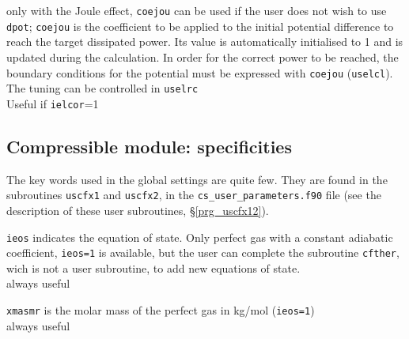 {only with the Joule effect, \texttt{coejou} can be used if the user does not
wish to use \texttt{dpot}; \texttt{coejou} is the coefficient to be applied
to the initial potential difference to reach the target dissipated power.
Its value is automatically initialised to 1 and is updated during the
calculation. In order for the correct power to be reached, the boundary
conditions for the potential must be expressed with \texttt{coejou}
(\texttt{uselcl}). The tuning can be controlled in \texttt{uselrc}\\
Useful if \texttt{ielcor}=1}

\subsection{Compressible module: specificities}

The key words used in the global settings are quite few. They are
found in the subroutines \texttt{uscfx1} and \texttt{uscfx2}, in
the \texttt{cs\_user\_parameters.f90} file (see the
description of these user subroutines, \S\ref{prg_uscfx12}).

{\texttt{ieos} indicates the equation of state. Only perfect gas with a constant adiabatic coefficient,
\texttt{ieos=1} is available, but the user can complete the subroutine 
\texttt{cfther}, wich is not a user subroutine, to add new equations of state.\\
always useful
}

{\texttt{xmasmr} is the molar mass of the perfect gas in kg/mol (\texttt{ieos=1})\\
always useful
}

